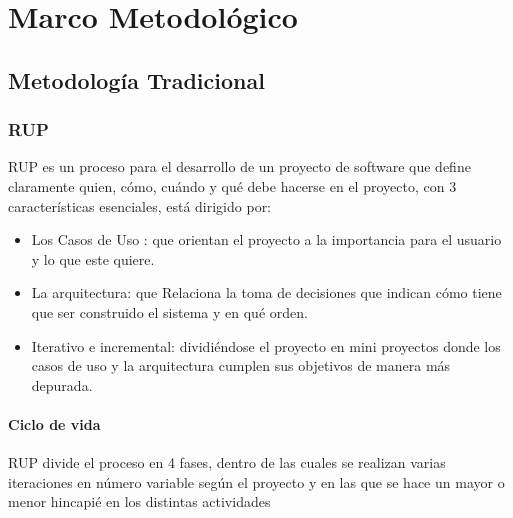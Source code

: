 \chapter{Marco Metodológico}


\section{Metodología Tradicional} 
\subsection{RUP}

 RUP es un proceso para el desarrollo de un proyecto de software que define claramente quien, cómo, cuándo y qué debe hacerse en el proyecto, con 3 características esenciales, está dirigido por:

\begin{itemize}

    \item Los Casos de Uso : que orientan el proyecto a la importancia para el usuario y lo que este quiere. 

    \item La arquitectura: que Relaciona la toma de decisiones que indican cómo tiene que ser construido el sistema y en qué orden.

    \item Iterativo e incremental: dividiéndose el proyecto en mini proyectos donde los casos de uso y la arquitectura cumplen sus objetivos de manera más depurada.

\end{itemize}


\subsubsection{Ciclo de vida}
    RUP divide el proceso en 4 fases, dentro de las cuales se realizan varias iteraciones en número variable según el proyecto y en las que se hace un mayor o menor hincapié en los distintas actividades


